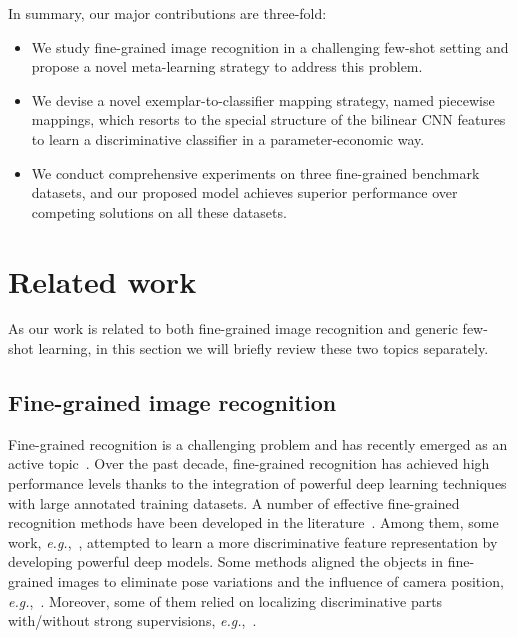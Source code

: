 \documentclass[10pt,twocolumn,letterpaper]{article}
\begin{document}
In summary, our major contributions are three-fold:
\begin{itemize}
\item We study fine-grained image recognition in a challenging few-shot setting and propose a novel meta-learning strategy to address this problem.
\item We devise a novel exemplar-to-classifier mapping strategy, named piecewise mappings, which resorts to the special structure of the bilinear CNN features to learn a discriminative classifier in a parameter-economic way.
\item We conduct comprehensive experiments on three fine-grained benchmark datasets, and our proposed model achieves superior performance over competing solutions on all these datasets.
\end{itemize}


\section{Related work}\label{sec:related}

As our work is related to both fine-grained image recognition and generic few-shot learning, in this section we will briefly review these two topics separately.

\subsection{Fine-grained image recognition}

Fine-grained recognition is a challenging problem and has recently emerged as an active topic~\cite{Khosla11stanforddogs, cars, WahCUB200_2011}. Over the past decade, fine-grained recognition has achieved high performance levels thanks to the integration of powerful deep learning techniques with large annotated training datasets. A number of effective fine-grained recognition methods have been developed in the literature~\cite{Steve14BMVC, Taomei17CVPR, Shao16CVPR, Max15NIPS, Di15CVPR, Tsungyu15ICCV, Yu16TIP}. Among them, some work, \emph{e.g.},~\cite{Max15NIPS, Tsungyu15ICCV}, attempted to learn a more discriminative feature representation by developing powerful deep models. Some methods aligned the objects in fine-grained images to eliminate pose variations and the influence of camera position, \emph{e.g.},~\cite{Steve14BMVC, Di15CVPR}. Moreover, some of them relied on localizing discriminative parts with/without strong supervisions, \emph{e.g.},~\cite{Taomei17CVPR, Shao16CVPR, Di15CVPR}.
\end{document}
